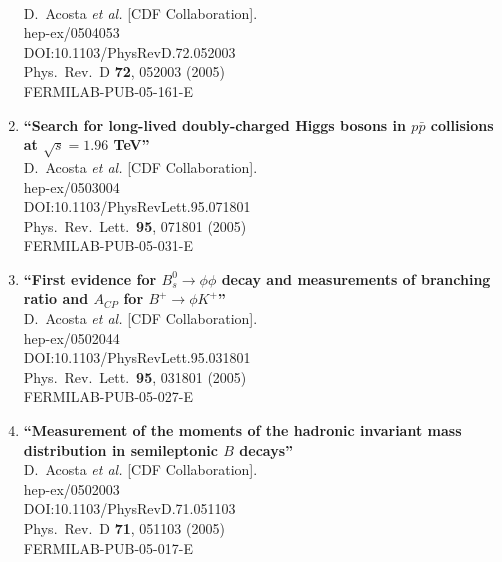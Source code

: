 \documentclass{article}
\begin{document}
\begin{enumerate}
  \\{}D.~Acosta {\it et al.} [CDF Collaboration].
  \\{}hep-ex/0504053
  \\{}DOI:10.1103/PhysRevD.72.052003
  \\{}Phys.\ Rev.\ D {\bf 72}, 052003 (2005)
  \\{}FERMILAB-PUB-05-161-E
\item%
{\bf ``Search for long-lived doubly-charged Higgs bosons in $p\bar{p}$ collisions at $\sqrt{s} = 1.96$ TeV''}
  \\{}D.~Acosta {\it et al.} [CDF Collaboration].
  \\{}hep-ex/0503004
  \\{}DOI:10.1103/PhysRevLett.95.071801
  \\{}Phys.\ Rev.\ Lett.\  {\bf 95}, 071801 (2005)
  \\{}FERMILAB-PUB-05-031-E
\item%
{\bf ``First evidence for $B_s^0 \to \phi \phi$ decay and measurements of branching ratio and $A_{CP}$ for $B^+ \to \phi K^+$''}
  \\{}D.~Acosta {\it et al.} [CDF Collaboration].
  \\{}hep-ex/0502044
  \\{}DOI:10.1103/PhysRevLett.95.031801
  \\{}Phys.\ Rev.\ Lett.\  {\bf 95}, 031801 (2005)
  \\{}FERMILAB-PUB-05-027-E
\item%
{\bf ``Measurement of the moments of the hadronic invariant mass distribution in semileptonic $B$ decays''}
  \\{}D.~Acosta {\it et al.} [CDF Collaboration].
  \\{}hep-ex/0502003
  \\{}DOI:10.1103/PhysRevD.71.051103
  \\{}Phys.\ Rev.\ D {\bf 71}, 051103 (2005)
  \\{}FERMILAB-PUB-05-017-E

\end{enumerate}
\end{document}

